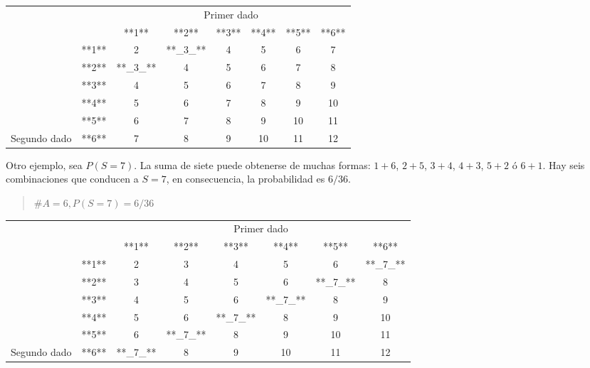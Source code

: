 \documentclass[]{book}
\begin{document}
\begin{table}[H]
\centering
\begin{tabular}{lccccccc}
\toprule
\multicolumn{2}{c}{ } & \multicolumn{6}{c}{Primer dado} \\
\cmidrule(l{3pt}r{3pt}){3-8}
 &  & **1** & **2** & **3** & **4** & **5** & **6**\\
\midrule
\rowcolor{gray!6}   & **1** & 2 & **\_3\_** & 4 & 5 & 6 & 7\\
\cmidrule{2-8}
 & **2** & **\_3\_** & 4 & 5 & 6 & 7 & 8\\
\cmidrule{2-8}
\rowcolor{gray!6}   & **3** & 4 & 5 & 6 & 7 & 8 & 9\\
\cmidrule{2-8}
 & **4** & 5 & 6 & 7 & 8 & 9 & 10\\
\cmidrule{2-8}
\rowcolor{gray!6}   & **5** & 6 & 7 & 8 & 9 & 10 & 11\\
\cmidrule{2-8}
\multirow[t]{-6}{*}{\raggedright\arraybackslash Segundo dado} & **6** & 7 & 8 & 9 & 10 & 11 & 12\\
\bottomrule
\end{tabular}
\end{table}

Otro ejemplo, sea \(P(S=7)\). La suma de siete puede obtenerse de muchas
formas: \(1+6\), \(2+5\), \(3+4\), \(4+3\), \(5+2\) ó \(6+1\). Hay seis combinaciones que
conducen a \(S=7\), en consecuencia, la probabilidad es \(6/36\).

\begin{quote}
\(\#A = 6, P(S = 7)=6/36\)
\end{quote}

\begin{table}[H]
\centering
\begin{tabular}{lccccccc}
\toprule
\multicolumn{2}{c}{ } & \multicolumn{6}{c}{Primer dado} \\
\cmidrule(l{3pt}r{3pt}){3-8}
 &  & **1** & **2** & **3** & **4** & **5** & **6**\\
\midrule
\rowcolor{gray!6}   & **1** & 2 & 3 & 4 & 5 & 6 & **\_7\_**\\
\cmidrule{2-8}
 & **2** & 3 & 4 & 5 & 6 & **\_7\_** & 8\\
\cmidrule{2-8}
\rowcolor{gray!6}   & **3** & 4 & 5 & 6 & **\_7\_** & 8 & 9\\
\cmidrule{2-8}
 & **4** & 5 & 6 & **\_7\_** & 8 & 9 & 10\\
\cmidrule{2-8}
\rowcolor{gray!6}   & **5** & 6 & **\_7\_** & 8 & 9 & 10 & 11\\
\cmidrule{2-8}
\multirow[t]{-6}{*}{\raggedright\arraybackslash Segundo dado} & **6** & **\_7\_** & 8 & 9 & 10 & 11 & 12\\
\bottomrule
\end{tabular}
\end{table}
\end{document}
